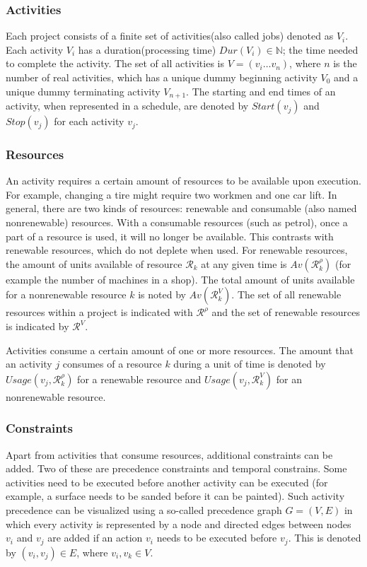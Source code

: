 \documentclass{article}
\begin{document}
\subsubsection{Activities}
Each project consists of a finite set of activities(also called jobs) denoted as $V_i$.
Each activity $V_i$ has a duration(processing time) $Dur(V_i) \in \mathbb{N}$; the time needed to complete the activity.
The set of all activities is $V = (v_i \ldots v_n)$, where $n$ is the number of real activities, which has a unique dummy beginning activity $V_0$ and a unique dummy terminating activity $V_{n+1}$.
The starting and end times of an activity, when represented in a schedule, are denoted by $Start(v_j)$ and $Stop(v_j)$ for each activity $v_j$.

\subsubsection{Resources}
An activity requires a certain amount of resources to be available upon execution.
For example, changing a tire might require two workmen and one car lift.
In general, there are two kinds of resources: renewable and consumable (also named nonrenewable) resources.
With a consumable resources (such as petrol), once a part of a resource is used, it will no longer be available.
This contrasts with renewable resources, which do not deplete when used.
For renewable resources, the amount of units available of resource $\mathcal{R}_k$ at any given time is $Av(\mathcal{R}^{\rho}_k)$ (for example the number of machines in a shop).
The total amount of units available for a nonrenewable resource $k$ is noted by $Av(\mathcal{R}^{V}_k)$.
The set of all renewable resources within a project is indicated with $\mathcal{R}^{\rho}$ and the set of renewable resources is indicated by $\mathcal{R}^{V}$. 

Activities consume a certain amount of one or more resources.
The amount that an activity $j$ consumes of a resource $k$ during a unit of time is denoted by $Usage(v_j, \mathcal{R}^{\rho}_k)$ for a renewable resource and   $Usage(v_j, \mathcal{R}^V_k)$ for an nonrenewable resource.


\subsubsection{Constraints}
Apart from activities that consume resources, additional constraints can be added.
Two of these are precedence constraints and temporal constrains.
Some activities need to be executed before another activity can be executed (for example, a surface needs to be sanded before it can be painted).
Such activity precedence can be visualized using a so-called precedence graph $G = (V, E)$ in which every activity is represented by a node and directed edges between nodes $v_i$ and $v_j$ are added if an action $v_i$ needs to be executed before $v_j$.
This is denoted by $(v_i,v_j) \in E$, where $v_i, v_k \in V$.
\end{document}
